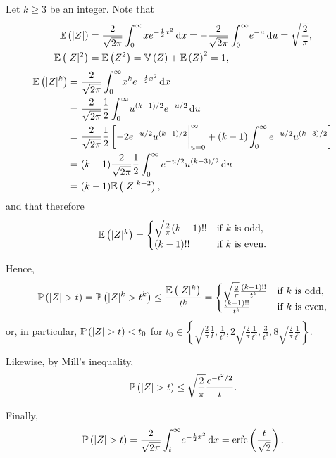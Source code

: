 \begin{ex}
  Let $k\geq 3$ be an integer. Note that
  \begin{align*}
    \mathbb{E}\left(|Z|\right)
     & =\frac{2}{\sqrt{2\pi}}\int_{0}^\infty\!xe^{-\frac{1}{2}x^2}\,\mathrm{d}{x}
    =-\frac{2}{\sqrt{2\pi}}\int_{0}^\infty\!e^{-u}\,\mathrm{d}{u}
    =\sqrt{\frac{2}{\pi}},                                                \\
    \mathbb{E}\left(|Z|^2\right)
     & =\mathbb{E}\left(Z^2\right)=\mathbb{V}\left(Z\right)+\mathbb{E}\left(Z\right)^2=1,
  \end{align*}
  \begin{align*}
    \mathbb{E}\left(|Z|^k\right)
     & =\frac{2}{\sqrt{2\pi}}\int_{0}^\infty\!x^ke^{-\frac{1}{2}x^2}\,\mathrm{d}{x}                  \\
     & =\frac{2}{\sqrt{2\pi}}\frac{1}{2}\int_0^\infty\!u^{(k-1)/2}e^{-u/2}\,\mathrm{d}{u}            \\
     & =\frac{2}{\sqrt{2\pi}}\frac{1}{2}\left[-2e^{-u/2}u^{(k-1)/2}\bigg\rvert_{u=0}^\infty+
    (k-1)\int_0^\infty e^{-u/2}u^{(k-3)/2}\right]                                            \\
     & =(k-1)\frac{2}{\sqrt{2\pi}}\frac{1}{2}\int_0^\infty e^{-u/2}u^{(k-3)/2}\,\mathrm{d}{u}        \\
     & =(k-1)\mathbb{E}\left(|Z|^{k-2}\right),
  \end{align*}
  and that therefore
  \[
    \mathbb{E}\left(|Z|^k\right)=\begin{cases}
      \sqrt{\frac{2}{\pi}}(k-1)!! & \text{if $k$ is odd},  \\
      (k-1)!!                     & \text{if $k$ is even}.
    \end{cases}
  \]

  Hence,
  \[
    \P{|Z|>t}
    =\P{|Z|^k>t^k}
    \leq \frac{\E{|Z|^k}}{t^k}
    =\begin{cases}
      \sqrt{\frac{2}{\pi}}\frac{(k-1)!!}{t^k} & \text{if $k$ is odd},  \\
      \frac{(k-1)!!}{t^k}                     & \text{if $k$ is even},
    \end{cases}
  \]
  or, in particular, $\P{|Z|>t}<t_0$ for $t_0\in\left\{
    \sqrt{\frac{2}{\pi}}\frac{1}{t}, \frac{1}{t^2}, 2\sqrt{\frac{2}{\pi}}\frac{1}{t^3},
    \frac{3}{t^4}, 8\sqrt{\frac{2}{\pi}}\frac{1}{t^5}
    \right\}$.

  Likewise, by Mill's inequality,
  \[
    \P{|Z|>t}
    \leq \sqrt{\frac{2}{\pi}}\frac{e^{-t^2/2}}{t}.
  \]

  Finally,
  \begin{align*}
    \P{|Z|>t}
    =\frac{2}{\sqrt{2\pi}}\int_{t}^\infty\!e^{-\frac{1}{2}x^2}\,\d{x}
    =\erfc\left(\frac{t}{\sqrt{2}}\right).
  \end{align*}


\end{ex}
